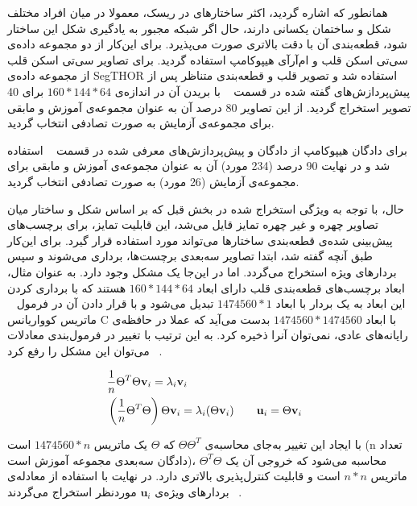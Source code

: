 
همانطور که اشاره گردید، اکثر ساختارهای در ریسک، معمولا در میان افراد مختلف شکل و ساختمان یکسانی دارند، حال اگر شبکه مجبور به یادگیری شکل این ساختار شود، قطعه‌بندی آن با دقت بالاتری صورت می‌پذیرد. برای این‌کار از دو مجموعه‌ داده‌ی سی‌تی اسکن قلب و ام‌آرآی هیپوکامپ استفاده گردید. برای تصاویر سی‌تی اسکن قلب از مجموعه داده‌ی SegTHOR استفاده شد و تصویر قلب و قطعه‌بندی متناظر پس از پیش‌پردازش‌های گفته شده در قسمت ~ با بریدن آن در اندازه‌ی $160*144*64$ برای 40 تصویر استخراج گردید. از این تصاویر 80 درصد آن به عنوان مجموعه‌ی آموزش و مابقی برای مجموعه‌ی آزمایش به صورت تصادفی انتخاب گردید. 

برای دادگان هیپوکامپ از دادگان و پیش‌پردازش‌های معرفی شده در قسمت ~ استفاده شد و در نهایت 90 درصد (234 مورد) آن به عنوان مجموعه‌ی آموزش و مابقی برای مجموعه‌ی آزمایش (26 مورد) به صورت تصادفی انتخاب گردید. 

حال، با توجه به ویژگی استخراج شده در بخش قبل که بر اساس شکل و ساختار میان تصاویر چهره و غیر چهره تمایز قایل می‌شد، این قابلیت تمایز، برای برچسب‌های پیش‌بینی شده‌ی قطعه‌بندی ساختارها می‌تواند مورد استفاده قرار گیرد. برای این‌کار طبق آنچه‌ گفته شد، ابتدا تصاویر سه‌بعدی برچست‌ها، برداری می‌شوند و سپس بردار‌های ویژه استخراج می‌گردد. اما در این‌جا یک مشکل وجود دارد. به عنوان مثال، ابعاد برچسب‌های قطعه‌بندی قلب دارای ابعاد $160*144*64$ هستند که با برداری کردن این ابعاد به یک بردار با ابعاد $1474560*1$ تبدیل می‌شود و با قرار دادن آن در فرمول ~ ماتریس کوواریانس C با ابعاد $1474560*1474560$ بدست می‌آید که عملا در حافظه‌ی رایانه‌های عادی، نمی‌توان آنرا ذخیره کرد. به این ترتیب با تغییر در فرمول‌بندی معادلات ~ می‌توان این مشکل را رفع کرد.

\begin{alignat}{5}
	&\frac{1}{n}\Theta^T\Theta\mathbf{v}_i=\lambda_i\mathbf{v}_i     \notag && \\
	&\left(\frac{1}{n}\Theta^T\Theta\right)\Theta\mathbf{v}_i=\lambda_i(\Theta\mathbf{v}_i) \qquad \mathbf{u}_i = \Theta\mathbf{v}_i \label{modifpca} && 
\end{alignat}

با ایجاد این تغییر به‌جای محاسبه‌ی $\Theta\Theta^T$ که $\Theta$ یک ماتریس $1474560*n$ است (n تعداد دادگان سه‌بعدی مجموعه آموزش است)، $\Theta^T\Theta$ محاسبه می‌شود که خروجی آن یک ماتریس $n*n$ است و قابلیت کنترل‌پذیری بالاتری دارد. در نهایت با استفاده از معادله‌ی ~ بردارهای ویژه‌ی $\mathbf{u}_i$ موردنظر استخراج می‌گردند.

